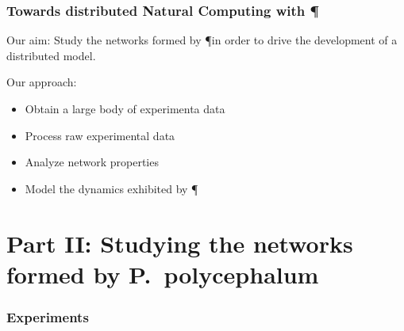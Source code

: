 \documentclass[	hyperref={pdfpagelabels=false}, xcolor=dvipsnames,
		11pt]{beamer}
\begin{document}
\begin{frame}
    \frametitle{Towards distributed Natural Computing with \P} 

    \begin{block}{Our aim:}
    	Study the networks formed by \P in order to drive the development of a distributed model.
    \end{block}

	\begin{alertblock}{Our approach:}
		\begin{itemize}
			\item Obtain a large body of experimenta data
			\item Process raw experimental data
			\item Analyze network properties
			\item Model the dynamics exhibited by \P
		\end{itemize}
	\end{alertblock}
\end{frame}

\section{Part II: Studying the networks formed by P.~polycephalum}

\begin{frame}
    \frametitle{Experiments} 

	\begin{overprint}

		\begin{figure}[h]
		 
			\begin{center}
			\end{center}
		\end{figure}  
	\end{overprint}
\end{frame}
\end{document}

